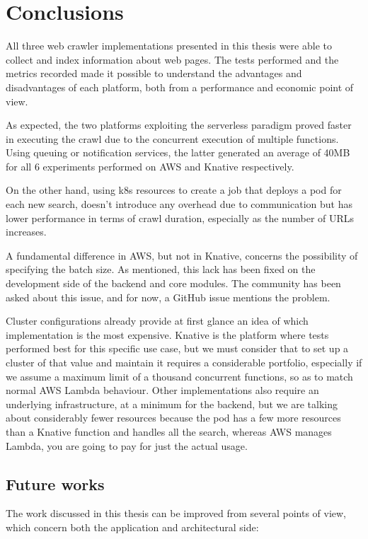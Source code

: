 \documentclass[../thesis.tex]{subfiles}
\begin{document}
\chapter{Conclusions}\label{cap:conclusion}
All three web crawler implementations presented in this thesis were able to collect and index information about web pages. The tests performed and the metrics recorded made it possible to understand the advantages and disadvantages of each platform, both from a performance and economic point of view.

As expected, the two platforms exploiting the serverless paradigm proved faster in executing the crawl due to the concurrent execution of multiple functions. Using queuing or notification services, the latter generated an average of 40MB for all 6 experiments performed on \acrshort{AWS} and Knative respectively.

On the other hand, using \gls{k8s} resources to create a \gls{job} that deploys a \gls{pod} for each new search, doesn't introduce any overhead due to communication but has lower performance in terms of crawl duration, especially as the number of \acrshort{URL}s increases.

A fundamental difference in \acrshort{AWS}, but not in Knative, concerns the possibility of specifying the batch size. As mentioned, this lack has been fixed on the development side of the backend and core modules. The community has been asked about this issue, and for now, a GitHub issue \cite{site:knative_batch_issue} mentions the problem.

Cluster configurations already provide at first glance an idea of which implementation is the most expensive. Knative is the platform where tests performed best for this specific use case, but we must consider that to set up a cluster of that value and maintain it requires a considerable portfolio, especially if we assume a maximum limit of a thousand concurrent functions, so as to match normal \acrshort{AWS} Lambda behaviour. Other implementations also require an underlying infrastructure, at a minimum for the backend, but we are talking about considerably fewer resources because the pod has a few more resources than a Knative function and handles all the search, whereas \acrshort{AWS} manages Lambda, you are going to pay for just the actual usage.

\section{Future works}\label{sec:future_works}
The work discussed in this thesis can be improved from several points of view, which concern both the application and architectural side:
\end{document}
